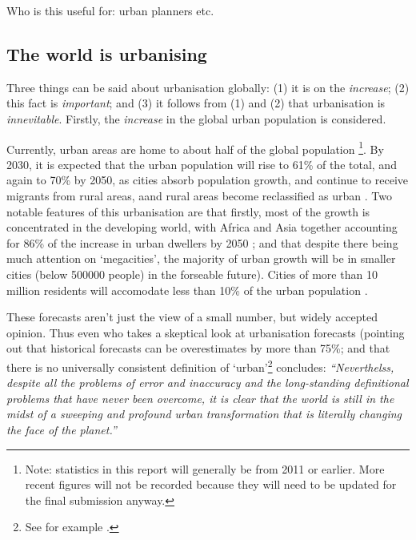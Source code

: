 Who is this useful for: urban planners etc.

\subsection{The world is urbanising}
Three things can be said about urbanisation globally: (1) it is on the \emph{increase}; (2) this fact is \emph{important}; and (3) it follows from (1) and (2) that urbanisation is \emph{innevitable}. Firstly, the \emph{increase} in the global urban population is considered.

Currently, urban areas are home to about half of the global population \citep{AREAS2012}\footnote{Note: statistics in this report will generally be from 2011 or earlier. More recent figures will not be recorded because they will need to be updated for the final submission anyway.}. By 2030, it is expected that the urban population will rise to 61\% of the total, and again to 70\% by 2050, as cities absorb population growth, and continue to receive migrants from rural areas, aand rural areas become reclassified as urban \citep{Cohen2006}. Two notable features of this urbanisation are that firstly, most of the growth is concentrated in the developing world, with Africa and Asia together accounting for 86\% of the increase in urban dwellers by 2050 \citep{York2011}; and that despite there being much attention on `megacities', the majority of urban growth will be in smaller cities (below 500000 people) in the forseable future). Cities of more than 10 million residents will accomodate less than 10\% of the urban population \citep{Cohen2006}.

These forecasts aren't just the view of a small number, but widely accepted opinion. Thus even \citet{Cohen2004} who takes a skeptical look at urbanisation forecasts (pointing out that historical forecasts can be overestimates by more than 75\%; and that there is no universally consistent definition of `urban'\footnote{See for example \citet{DepartmentforCommunitiesandLocalGovernment2006}.} concludes: \emph{``Neverthelss, despite all the problems of error and inaccuracy and the long-standing definitional problems that have never been overcome, it is clear that the world is still in the midst of a sweeping and profound urban transformation that is literally changing the face of the planet.''}


